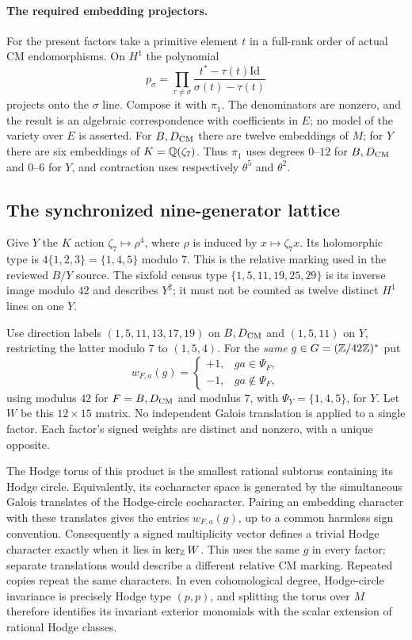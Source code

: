 \paragraph{The required embedding projectors.}
For the present factors take a primitive element $t$ in a full-rank
order of actual CM endomorphisms. On $H^1$ the polynomial
\[
 p_\sigma=\prod_{\tau\ne\sigma}
       \frac{t^*-\tau(t)\mathrm{Id}}{\sigma(t)-\tau(t)}
\]
projects onto the $\sigma$ line. Compose it with $\pi_1$. The
denominators are nonzero, and the result is an algebraic correspondence
with coefficients in $E$; no model of the variety over $E$ is asserted.
For $B,{D_{\mathrm{CM}}}$ there are twelve embeddings of $M$; for $Y$ there are six
embeddings of $K=\mathbb Q(\zeta_7)$. Thus $\pi_1$ uses degrees $0$--$12$
for $B,{D_{\mathrm{CM}}}$ and $0$--$6$ for $Y$, and contraction uses respectively
$\theta^5$ and $\theta^2$.

\subsection{The synchronized nine-generator lattice}\label{ext:sec:lattice}
Give $Y$ the $K$ action $\zeta_7\mapsto\rho^4$, where
$\rho$ is induced by $x\mapsto\zeta_7x$. Its holomorphic type is
$4\{1,2,3\}=\{1,4,5\}$ modulo $7$. This is the relative marking
used in the reviewed $B/Y$ source. The sixfold census type
$\{1,5,11,19,25,29\}$ is its inverse image modulo $42$ and describes
$Y^2$; it must not be counted as twelve distinct $H^1$ lines on one $Y$.

Use direction labels $(1,5,11,13,17,19)$ on $B,{D_{\mathrm{CM}}}$ and $(1,5,11)$
on $Y$, restricting the latter modulo $7$ to $(1,5,4)$. For the
\emph{same} $g\in G=(\mathbb Z/42\mathbb Z)^*$ put
\[
 w_{F,a}(g)=
 \begin{cases}
  +1,&ga\in\Psi_F,\\-1,&ga\notin\Psi_F,
 \end{cases}
\]
using modulus $42$ for $F=B,{D_{\mathrm{CM}}}$ and modulus $7$, with
$\Psi_Y=\{1,4,5\}$, for $Y$. Let $W$ be this $12\times15$ matrix.
No independent Galois translation is applied to a single factor. Each
factor's signed weights are distinct and nonzero, with a unique opposite.

The Hodge torus of this product is the smallest rational subtorus
containing its Hodge circle. Equivalently, its cocharacter space is
generated by the simultaneous Galois translates of the Hodge-circle
cocharacter. Pairing an embedding character with these translates gives
the entries $w_{F,a}(g)$, up to a common harmless sign convention.
Consequently a signed multiplicity vector defines a trivial Hodge
character exactly when it lies in $\ker_{\mathbb Z}W$. This uses the same $g$
in every factor: separate translations would describe a different
relative CM marking. Repeated copies repeat the same characters. In
even cohomological degree, Hodge-circle invariance is precisely Hodge
type $(p,p)$, and splitting the torus over $M$ therefore identifies its
invariant exterior monomials with the scalar extension of rational
Hodge classes.


